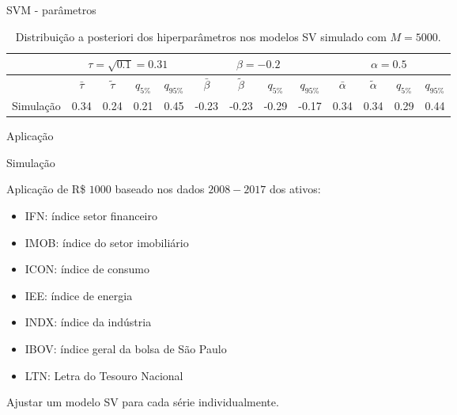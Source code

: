 \documentclass{beamer}
\begin{document}
 
 \begin{frame}{SVM - parâmetros}


\begin{table}[ht]
\centering
\tiny
\begin{tabular}{c|cccc|cccc|cccc}
 \hline
  \hline
 & \multicolumn{4}{c|}{$\tau=\sqrt{0.1}=0.31$} &  \multicolumn{4}{c|}{$\beta=-0.2$} &  \multicolumn{4}{c}{$\alpha=0.5$} \\
 \hline
  & $\bar{\tau}$ & $\tilde{\tau}$ & $q_{5\%}$ & $q_{95\%}$ & $\bar{\beta}$ & $\tilde{\beta}$ & $q_{5\%}$ & $q_{95\%}$ & $\bar{\alpha}$ & $\tilde{\alpha}$ & $q_{5\%}$ & $q_{95\%}$\\ 
  \hline
Simulação & 0.34 & 0.24 & 0.21 & 0.45 & -0.23 & -0.23 & -0.29 & -0.17 & 0.34 & 0.34 & 0.29 & 0.44 \\ 
   \hline
    \hline
\end{tabular}
\caption[\scriptsize{Distribuição a posteriori de $\tau$, $\beta$ e $\alpha$}]{\scriptsize{Distribuição a posteriori dos hiperparâmetros nos modelos SV simulado com $M=5000$.}}
\label{tab:hiperest1000simula}
\end{table}

\end{frame}



 
\begin{frame}{}
    \begin{block}{ }
      \Huge  Aplicação
    \end{block}
\end{frame}

 
 \begin{frame}{Simulação}


Aplicação de R\$ $1000$ baseado nos dados $2008-2017$ dos ativos:
\vspace{.25cm}
\begin{itemize}
\item IFN:  índice setor financeiro
\item IMOB: índice do setor imobiliário
\item ICON: índice de consumo
\item IEE:  índice de energia
\item INDX: índice da indústria
\item IBOV: índice geral da bolsa de São Paulo
\item LTN: Letra do Tesouro Nacional
\end{itemize}
\vspace{.25cm}

Ajustar um modelo SV para cada série individualmente.
\end{frame}
\end{document}

